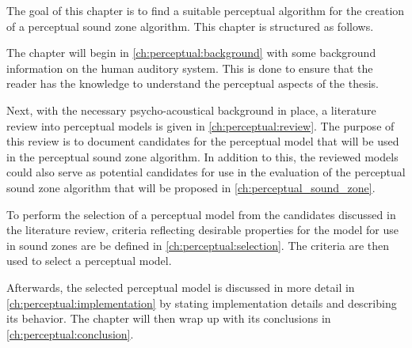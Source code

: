 The goal of this chapter is to find a suitable perceptual algorithm for the creation of a perceptual sound zone algorithm.
This chapter is structured as follows.

The chapter will begin in \autoref{ch:perceptual:background} with some background information on the human auditory system.
This is done to ensure that the reader has the knowledge to understand the perceptual aspects of the thesis.

Next, with the necessary psycho-acoustical background in place, a literature review into perceptual models is given in \autoref{ch:perceptual:review}.
The purpose of this review is to document candidates for the perceptual model that will be used in the perceptual sound zone algorithm.
In addition to this, the reviewed models could also serve as potential candidates for use in the evaluation 
of the perceptual sound zone algorithm that will be proposed in \autoref{ch:perceptual_sound_zone}.

To perform the selection of a perceptual model from the candidates discussed in the literature review, 
criteria reflecting desirable properties for the model for use in sound zones are be defined in \autoref{ch:perceptual:selection}. 
The criteria are then used to select a perceptual model.

Afterwards, the selected perceptual model is discussed in more detail in \autoref{ch:perceptual:implementation} by stating implementation 
details and describing its behavior.
The chapter will then wrap up with its conclusions in \autoref{ch:perceptual:conclusion}.
